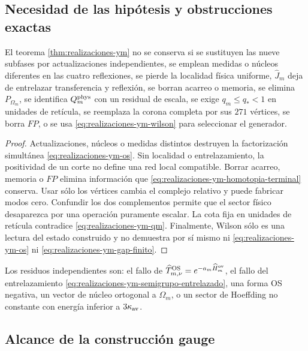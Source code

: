\subsection*{Necesidad de las hipótesis y obstrucciones exactas}

\begin{ablation}
\label{abl:realizaciones-ym}
El teorema \ref{thm:realizaciones-ym} no se conserva si se sustituyen las
nueve subfases por actualizaciones independientes, se emplean medidas o
núcleos diferentes en las cuatro reflexiones, se pierde la localidad física
uniforme, \(\widehat J_m\) deja de entrelazar transferencia y reflexión, se
borran acarreo o memoria, se elimina \(P_{\Omega_m}\), se identifica
\(Q_m^{\rm phys}\) con un residual de escala, se exige
\(q_m\leq q_*<1\) en unidades de retícula, se reemplaza la corona completa
por sus \(271\) vértices, se borra \(FP\), o se usa
\eqref{eq:realizaciones-ym-wilson} para seleccionar el generador.
\end{ablation}

\begin{proof}
Actualizaciones, núcleos o medidas distintos destruyen la factorización
simultánea \eqref{eq:realizaciones-ym-os}. Sin localidad o entrelazamiento,
la positividad de un corte no define una red local compatible. Borrar acarreo,
memoria o \(FP\) elimina información que
\eqref{eq:realizaciones-ym-homotopia-terminal} conserva. Usar sólo los
vértices cambia el complejo relativo y puede fabricar modos cero. Confundir
los dos complementos permite que el sector físico desaparezca por una
operación puramente escalar. La cota fija en unidades de retícula contradice
\eqref{eq:realizaciones-ym-qm}. Finalmente, Wilson sólo es una lectura del
estado construido y no demuestra por sí mismo ni
\eqref{eq:realizaciones-ym-os} ni
\eqref{eq:realizaciones-ym-gap-finito}.
\end{proof}

Los residuos independientes son: el fallo de
\(\widehat T_{m,\nu}^{\rm OS}=e^{-a_m\widehat H_m^{\rm ov}}\), el fallo del
entrelazamiento \eqref{eq:realizaciones-ym-semigrupo-entrelazado}, una forma
OS negativa, un vector de núcleo ortogonal a \(\Omega_m\), o un sector de
Hoeffding no constante con energía inferior a \(3\kappa_{\rm av}\).

\subsection*{Alcance de la construcción gauge}

